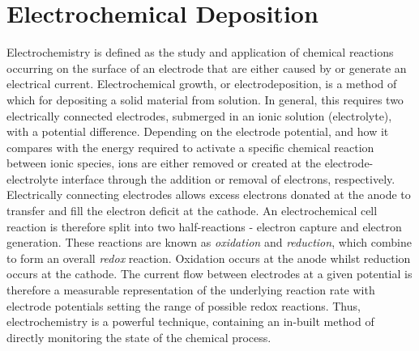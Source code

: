 \documentclass{article}
\begin{document}
\section{Electrochemical Deposition}


Electrochemistry is defined as the study and application of chemical reactions occurring on the surface of an electrode that are either caused by or generate an electrical current. Electrochemical growth, or electrodeposition, is a method of which for depositing a solid material from solution. In general, this requires two electrically connected electrodes, submerged in an ionic solution (electrolyte), with a potential difference. Depending on the electrode potential, and how it compares with the energy required to activate a specific chemical reaction between ionic species, ions are either removed or created at the electrode-electrolyte interface through the addition or removal of electrons, respectively. Electrically connecting electrodes allows excess electrons donated at the anode to transfer and fill the electron deficit at the cathode. An electrochemical cell reaction is therefore split into two half-reactions - electron capture and electron generation. These reactions are known as \emph{oxidation} and \emph{reduction}, which combine to form an overall \emph{redox} reaction. Oxidation occurs at the anode whilst reduction occurs at the cathode. The current flow between electrodes at a given potential is therefore a measurable representation of the underlying reaction rate with electrode potentials setting the range of possible redox reactions. Thus, electrochemistry is a powerful technique, containing an in-built method of directly monitoring the state of the chemical process.
\end{document}
